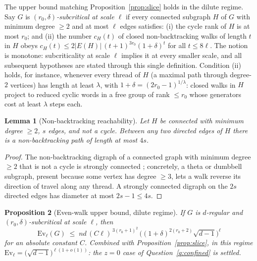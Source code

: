 \documentclass[11pt]{article}
\newtheorem{lemma}{Lemma}
\newtheorem{proposition}[lemma]{Proposition}
\theoremstyle{remark}
\begin{document}
The upper bound matching Proposition~\ref{prop:slice} holds in the
dilute regime. Say $G$ is \emph{$(r_0,\delta)$-subcritical at scale
$\ell$} if every connected subgraph $H$ of $G$ with minimum degree
$\ge2$ and at most $\ell$ edges satisfies: (i) the cycle rank of $H$
is at most $r_0$; and (ii) the number $c_H(t)$ of closed
non-backtracking walks of length $t$ in $H$ obeys
$c_H(t)\le 2|E(H)|\,(t+1)^{3r_0}(1+\delta)^{t}$ for all $t\le8\ell$.
The notion is monotone: subcriticality at scale $\ell$ implies it
at every smaller scale, and all subsequent hypotheses are stated
through this single definition.
Condition (ii) holds, for instance, whenever every thread of $H$ (a
maximal path through degree-$2$ vertices) has length at least
$\lambda$, with $1+\delta=(2r_0-1)^{1/\lambda}$: closed walks in $H$
project to reduced cyclic words in a free group of rank $\le r_0$ whose
generators cost at least $\lambda$ steps each.

\begin{lemma}[Non-backtracking reachability]\label{lem:reach}
Let $H$ be connected with minimum degree $\ge2$, $s$ edges, and not a
cycle. Between any two directed edges of $H$ there is a
non-backtracking path of length at most $4s$.
\end{lemma}

\begin{proof}
The non-backtracking digraph of a connected graph with minimum degree
$\ge2$ that is not a cycle is strongly connected \cite{ks00};
concretely, a theta or dumbbell subgraph, present because some
vertex has degree $\ge3$, lets a walk reverse its direction of
travel along any thread. A strongly connected digraph on the $2s$
directed edges has diameter at most $2s-1\le4s$.
\end{proof}

\begin{proposition}[Even-walk upper bound, dilute regime]\label{prop:upper}
If $G$ is $d$-regular and $(r_0,\delta)$-subcritical at scale $\ell$,
then
\[
\mathrm{Ev}_\ell(G)\;\le\;
nd\,(C\ell)^{\,3(r_0+1)^2}\,
\Big((1+\delta)^{2(r_0+2)}\sqrt{d-1}\Big)^{\ell}
\]
for an absolute constant $C$. Combined with
Proposition~\ref{prop:slice}, in this regime
$\mathrm{Ev}_\ell=\big(\sqrt{d-1}\big)^{\ell(1+o(1))}$: the $z=0$ case
of Question~\ref{q:confined} is settled.
\end{proposition}
\end{document}
